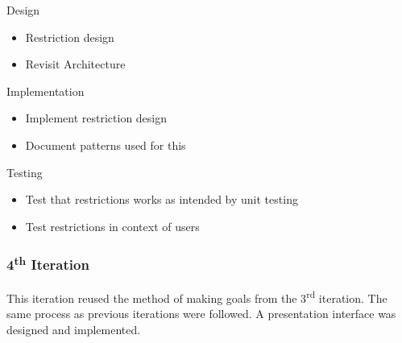 Design
\begin{itemize}
  \item Restriction design
  \item Revisit Architecture
\end{itemize}

Implementation
\begin{itemize}
  \item Implement restriction design
  \item Document patterns used for this
\end{itemize}

Testing
\begin{itemize}
  \item Test that restrictions works as intended by unit testing
  \item Test restrictions in context of users
\end{itemize}

\subsubsection{4\textsuperscript{th} Iteration}

This iteration reused the method of making goals from the
3\textsuperscript{rd} iteration.  The same process as previous
iterations were followed. A presentation interface was designed and implemented.
